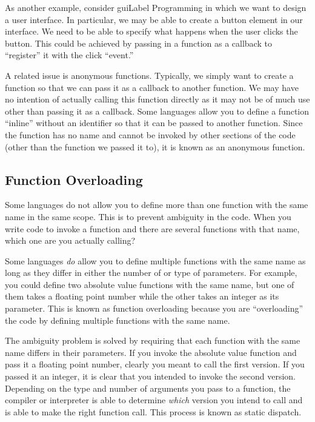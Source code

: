 As another example, consider \gls{guiLabel} Programming in which we
want to design a user interface.  In particular, we may be able to create
a button element in our interface.  We need to be able to specify what 
happens when the user clicks the button.  This could be achieved by
passing in a function as a callback to ``register'' it with the click ``event.''


A related issue is \glspl{anonymous function}.  Typically, we simply 
want to create a function so that we can pass it as a callback to another 
function.  We may have no intention of actually calling this function directly
as it may not be of much use other than passing it as a callback.  Some 
languages allow you to define a function ``inline'' without an identifier 
so that it can be passed to another function.  Since the function has no
name and cannot be invoked by other sections of the code (other than
the function we passed it to), it is known as an anonymous function.

\subsection{Function Overloading}
\label{subsection:functionOverloading}

Some languages do not allow you to define more than one function with
the same name in the same scope.  This is to prevent ambiguity in the
code.  When you write code to invoke a function and there are several
functions with that name, which one are you actually calling?  

Some languages \emph{do} allow you to define multiple functions
with the same name as long as they differ in either the number of
or type of parameters.  For example, you could define two absolute
value functions with the same name, but one of them takes a floating
point number while the other takes an integer as its parameter.  This
is known as \gls{function overloading} because you are ``overloading''
the code by defining multiple functions with the same name.

The ambiguity problem is solved by requiring that each function with the
same name differs in their parameters.  If you invoke the absolute
value function and pass it a floating point number, clearly you meant 
to call the first version.  If you passed it an integer, it is clear that you
intended to invoke the second version.  Depending on the type and
number of arguments you pass to a function, the compiler or 
interpreter is able to determine \emph{which} version you intend
to call and is able to make the right function call.  This process is
known as \gls{static dispatch}.

